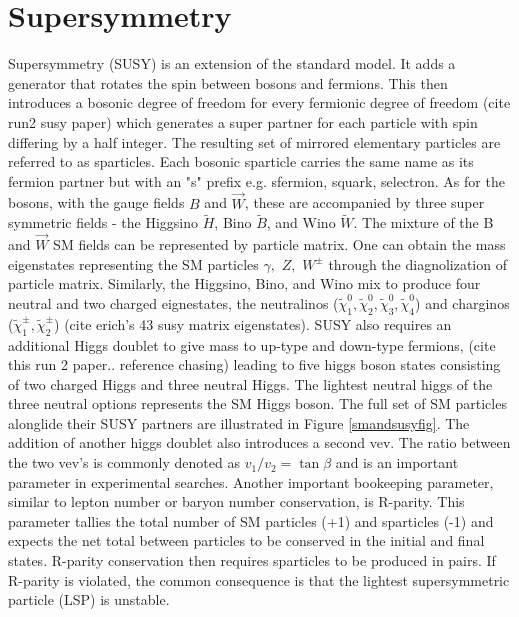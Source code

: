 \section{Supersymmetry}

Supersymmetry (SUSY) is an extension of the standard model. It adds a generator that rotates the spin between bosons and fermions. This then introduces a bosonic degree of freedom for every fermionic degree of freedom (cite run2 susy paper) which generates a super partner for each particle with spin differing by a half integer.  The resulting set of mirrored elementary particles are referred to as sparticles. Each bosonic sparticle carries the same name as its fermion partner but with an "s" prefix e.g. sfermion, squark, selectron. As for the bosons, with the gauge fields $B$ and $\vec{W}$, these are accompanied by three super symmetric fields - the Higgsino $\tilde{H}$, Bino $\tilde{B}$, and Wino $\tilde{W}$. The mixture of the B and $\vec{W}$ SM fields can be represented by particle matrix. One can obtain the  mass eigenstates representing the SM particles $\gamma, \, \, Z, \, \, W^\pm$ through the diagnolization of particle matrix. Similarly, the Higgsino, Bino, and Wino mix to produce four neutral and two charged eignestates, the neutralinos ($\tilde{\chi}^0_1, \tilde{\chi}^0_2, \tilde{\chi}^0_3, \tilde{\chi}^0_4$)  and charginos ($\tilde{\chi}^\pm_1, \tilde{\chi}^\pm_2$) (cite erich's 43 susy matrix eigenstates). SUSY also requires an additional Higgs doublet to give mass to up-type and down-type fermions, (cite this run 2 paper.. reference chasing) leading to five higgs boson states consisting of two charged Higgs and three neutral Higgs. The lightest neutral higgs of the three neutral options represents the SM Higgs boson. The full set of SM particles alonglide their SUSY partners are illustrated in Figure \ref{smandsusyfig}. The addition of another higgs doublet also introduces a second vev. The ratio between the two vev's  is commonly denoted as $v_1/v_2 = \tan \beta$ and is an important parameter in experimental searches. Another important bookeeping parameter, similar to lepton number or baryon number conservation, is R-parity. This parameter tallies the total number of SM particles (+1) and sparticles (-1) and expects the net total between particles to be conserved in the initial and final states. R-parity conservation then requires sparticles to be produced in pairs. If R-parity is violated, the common consequence is that the lightest supersymmetric particle (LSP) is unstable. 




